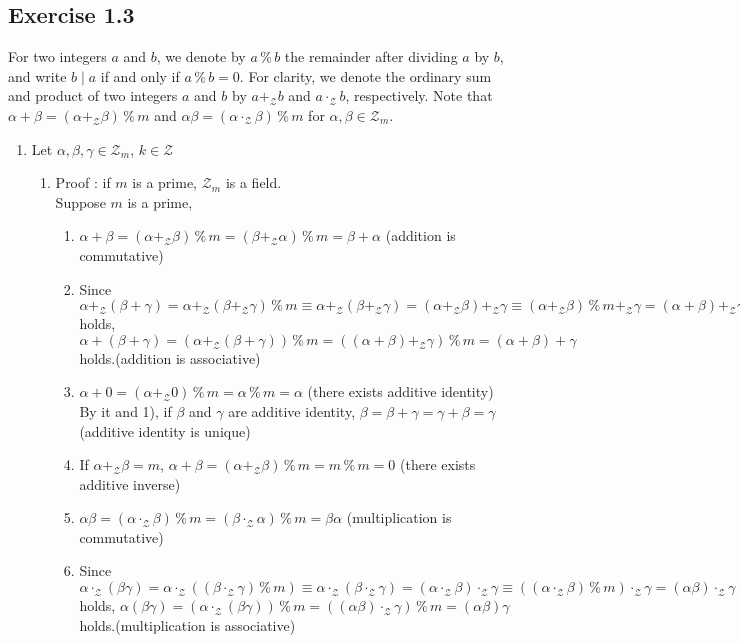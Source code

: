 \documentclass{article}
\newcommand\Z{\mathcal Z}
\begin{document}
\subsection{Exercise 1.3}
\newcommand\rem{\mathbin\%} %
\newcommand\Zm{\mathcal Z_m} %
For two integers $a$ and $b$,
we denote by $a \rem b$ the remainder after dividing $a$ by $b$,
and write $b \mid a$ if and only if $a \rem b = 0$.
For clarity,
we denote the ordinary sum and product of two integers $a$ and $b$
by $a +_\Z b$ and $a \cdot_\Z b$, respectively.
Note that $\alpha + \beta = (\alpha +_\Z \beta) \rem m$
and $\alpha\beta = (\alpha \cdot_\Z \beta) \rem m$
for $\alpha, \beta \in \Zm$.
\begin{enumerate}[label=(\alph*)]
  \item  Let $\alpha,\beta,\gamma \in \Zm$, $k \in \Z$
    \begin{enumerate}[label = \arabic*']
      \item\label{it:ex1.3.a.r} Proof : if $m$ is a prime, $\Zm$ is a field.\\
        Suppose $m$ is a prime,
        \begin{enumerate}[label=\arabic*)]
          \item\label{it:ex1.3.a.r.A1} $\alpha + \beta = (\alpha +_\Z \beta) \rem m = (\beta +_\Z \alpha) \rem m = \beta + \alpha$ (addition is commutative)
          \item  Since $\alpha +_\Z (\beta + \gamma) = \alpha +_\Z (\beta +_\Z \gamma) \rem m \equiv \alpha +_\Z (\beta +_\Z \gamma) = (\alpha +_\Z \beta) +_\Z \gamma \equiv (\alpha +_\Z \beta) \rem m +_\Z \gamma = (\alpha + \beta) +_\Z \gamma \pmod m$ holds, $\alpha + (\beta + \gamma) = (\alpha +_\Z (\beta + \gamma)) \rem m  = ((\alpha + \beta) +_\Z \gamma) \rem m = (\alpha + \beta) + \gamma $ holds.(addition is associative)
          \item  $\alpha + 0 = (\alpha +_\Z 0) \rem m = \alpha \rem m = \alpha$ (there exists additive identity)  By it and 1), if $\beta$ and $\gamma$ are additive identity, $\beta = \beta + \gamma = \gamma + \beta = \gamma$ (additive identity is unique)
          \item  If $\alpha + _\Z\beta = m$, $\alpha + \beta = (\alpha + _\Z\beta) \rem m = m \rem m = 0$ (there exists additive inverse)
          \item  $\alpha\beta = (\alpha \cdot_\Z \beta) \rem m = (\beta \cdot_\Z \alpha) \rem m = \beta\alpha$ (multiplication is commutative)
          \item  Since $\alpha \cdot_\Z (\beta\gamma) = \alpha \cdot_\Z ((\beta \cdot_\Z \gamma) \rem m) \equiv \alpha \cdot_\Z (\beta \cdot_\Z \gamma) = (\alpha \cdot_\Z \beta) \cdot_\Z \gamma \equiv ((\alpha \cdot_\Z \beta) \rem m) \cdot_\Z \gamma = (\alpha\beta) \cdot_\Z \gamma \pmod m$ holds, $\alpha(\beta\gamma) = (\alpha \cdot_\Z (\beta\gamma)) \rem m = ((\alpha\beta)\cdot_\Z \gamma) \rem m = (\alpha\beta)\gamma$ holds.(multiplication is associative)

\end{enumerate}
\end{enumerate}
\end{enumerate}
\end{document}

